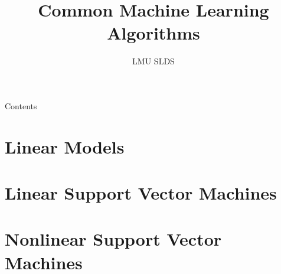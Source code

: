 




\title{Common Machine Learning Algorithms}
\author{LMU SLDS}
\date{}

\newcommand{\titlefigure}{figure_man/mckenzie_ai}
\newcommand{\titlefiguresize}{0.6}
\newcommand{\titlefiguresource}{https://www.vpnsrus.com/}







\lecturechapter{}

\begin{frame}{Contents}
  \tableofcontents
\end{frame}

\footnotesize

\section{Linear Models}


% 

\section{Linear Support Vector Machines}


\section{Nonlinear Support Vector Machines}


